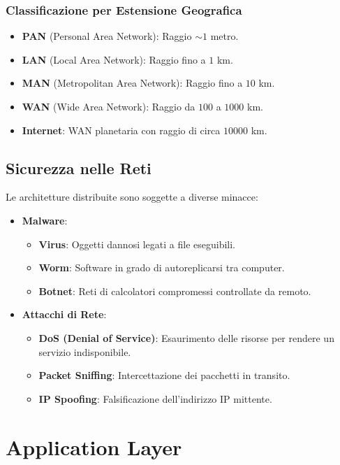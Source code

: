 \documentclass[12pt,a4paper,oneside]{book}
\begin{document}
\subsection{Classificazione per Estensione Geografica}
\begin{itemize}
    \item \textbf{PAN} (Personal Area Network): Raggio $\sim 1$ metro.
    \item \textbf{LAN} (Local Area Network): Raggio fino a $1$ km.
    \item \textbf{MAN} (Metropolitan Area Network): Raggio fino a $10$ km.
    \item \textbf{WAN} (Wide Area Network): Raggio da $100$ a $1000$ km.
    \item \textbf{Internet}: WAN planetaria con raggio di circa $10000$ km.
\end{itemize}

\section{Sicurezza nelle Reti}

Le architetture distribuite sono soggette a diverse minacce:

\begin{itemize}
    \item \textbf{Malware}: 
    \begin{itemize}
        \item \textbf{Virus}: Oggetti dannosi legati a file eseguibili.
        \item \textbf{Worm}: Software in grado di autoreplicarsi tra computer.
        \item \textbf{Botnet}: Reti di calcolatori compromessi controllate da remoto.
    \end{itemize}
    \item \textbf{Attacchi di Rete}:
    \begin{itemize}
        \item \textbf{DoS (Denial of Service)}: Esaurimento delle risorse per rendere un servizio indisponibile.
        \item \textbf{Packet Sniffing}: Intercettazione dei pacchetti in transito.
        \item \textbf{IP Spoofing}: Falsificazione dell'indirizzo IP mittente.
    \end{itemize}
\end{itemize}

\chapter{Application Layer}
\end{document}
